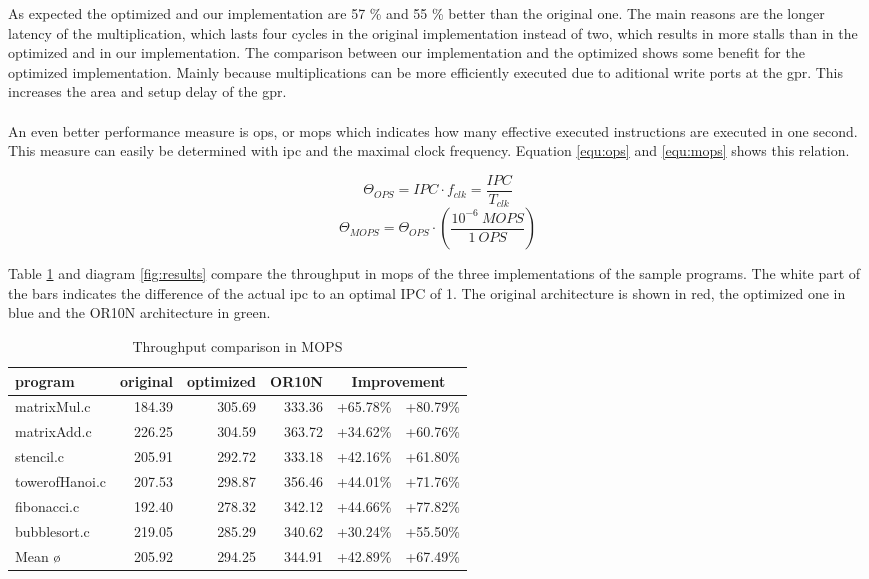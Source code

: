 As expected the optimized and our implementation are 57 \% and 55 \% better than the original one. The main reasons are the longer latency of the multiplication, which lasts four cycles in the original implementation instead of two, which results in more stalls than in the optimized and in our implementation. The comparison between our implementation and the optimized shows some benefit for the optimized implementation. Mainly because multiplications can be more efficiently executed due to aditional write ports at the \gls{gpr}. This increases the area and setup delay of the \gls{gpr}.  \\ \\

An even better performance measure is \gls{ops}, or \gls{mops} which indicates how many effective executed instructions are executed in one second. This measure can easily be determined with \gls{ipc} and the maximal clock frequency. Equation \ref{equ:ops} and \ref{equ:mops} shows this relation. 

\begin{equation}
\label{equ:ops}
\Theta_{OPS} = IPC \cdot f_{clk}= \frac{IPC}{T_{clk}}
\end{equation}
\begin{equation}
\label{equ:mops}
\Theta_{MOPS} = \Theta_{OPS} \cdot \left( \frac{10^{-6}\ MOPS}{1\ OPS}\right)
\end{equation}

Table \ref{tab:ops_cmp} and diagram \ref{fig:results} compare the throughput in \gls{mops} of the three implementations of the sample programs. The white part of the bars indicates the difference of the actual \gls{ipc} to an optimal IPC of 1. The original architecture is shown in red, the optimized one in blue and the OR10N architecture in green.

\begin{table}[htbp]
 \caption{Throughput comparison in MOPS}
 \label{tab:ops_cmp}
\centering\begin{tabular}{|l|r|r|r||r|r|} \hline
program & original & optimized & OR10N & \multicolumn{2}{c|}{Improvement} \\ \hline
matrixMul.c & 184.39 & 305.69 & 333.36 & +65.78\% & +80.79\% \\ \hline
matrixAdd.c & 226.25 & 304.59 & 363.72 & +34.62\% & +60.76\% \\ \hline
stencil.c & 205.91 & 292.72 & 333.18 & +42.16\% & +61.80\% \\ \hline
towerofHanoi.c & 207.53 & 298.87 & 356.46 & +44.01\% & +71.76\% \\ \hline
fibonacci.c & 192.40 & 278.32 & 342.12 & +44.66\% & +77.82\% \\ \hline
bubblesort.c & 219.05 & 285.29 & 340.62 & +30.24\% & +55.50\% \\ \hline\hline
Mean \o & 205.92 & 294.25 & 344.91 & +42.89\% & +67.49\% \\ \hline
\end{tabular}
\end{table}

